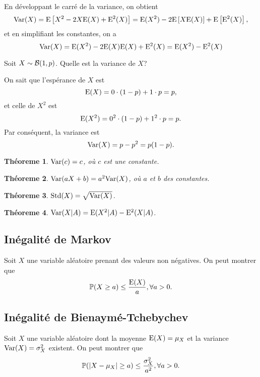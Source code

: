 \documentclass[11pt]{article}
\renewcommand\P{%
	\ensuremath{%
		\mathbb{P}%
	}%
}%
\newcommand\bin{%
	\ensuremath{%
		\mathcal{B}%
	}%
}%
\newcommand\Esp{%
	\ensuremath{%
		\mathrm{E}%
	}%
}%
\newcommand\Var{%
	\ensuremath{%
		\mathrm{Var}%
	}%
}%
\newcommand\Std{%
	\ensuremath{%
		\mathrm{Std}%
	}%
}%
\newtheorem{theoreme}{Théoreme}[section]
\begin{document}
En développant le carré de la variance, on obtient
\begin{equation*}
	\Var(X)
	=\Esp\left[X^2-2X\Esp(X)+\Esp^2(X)\right]
	=\Esp(X^2)-2\Esp\left[X\Esp(X)\right]+\Esp\left[\Esp^2(X)\right],
\end{equation*}
et en simplifiant les constantes, on a
\begin{equation*}
	\Var(X)
	=\Esp(X^2)-2\Esp(X)\Esp(X)+\Esp^2(X)
	=\Esp(X^2)-\Esp^2(X)
\end{equation*}

\begin{exemple}
	Soit $X\sim\bin(1,p)$. Quelle est la variance de $X$?

	On sait que l'espérance de $X$ est
	\begin{equation*}
		\Esp(X)=0\cdot(1-p)+1\cdot p=p,
	\end{equation*}
	et celle de $X^2$ est
	\begin{equation*}
		\Esp(X^2)=0^2\cdot(1-p)+1^2\cdot p=p.
	\end{equation*}
	Par conséquent, la variance est
	\begin{equation*}
		\Var(X)=p-p^2=p(1-p).
	\end{equation*}
\end{exemple}

\begin{theoreme}
	$\Var(c)=c$, où $c$ est une constante.
\end{theoreme}

\begin{theoreme}
	$\Var(aX+b)=a^2\Var(X)$, où $a$ et $b$ des constantes.
\end{theoreme}

\begin{theoreme}
	$\Std(X)=\sqrt{\Var(X)}$.
\end{theoreme}

\begin{theoreme}
	$\Var(X|A)=\Esp(X^2|A)-\Esp^2(X|A)$.
\end{theoreme}

\subsection{Inégalité de Markov}
Soit $X$ une variable aléatoire prenant des valeurs non négatives. On peut
montrer que
\begin{equation*}
	\P(X\geq a)\leq\frac{\Esp(X)}{a},\forall a>0.
\end{equation*}

\subsection{Inégalité de Bienaymé-Tchebychev}
Soit $X$ une variable aléatoire dont la moyenne $\Esp(X)=\mu_X$ et la variance
$\Var(X)=\sigma_X^2$ existent. On peut montrer que
\begin{equation*}
	\P(|X-\mu_X|\geq a)\leq\frac{\sigma_X^2}{a^2},\forall a>0.
\end{equation*}
\end{document}
